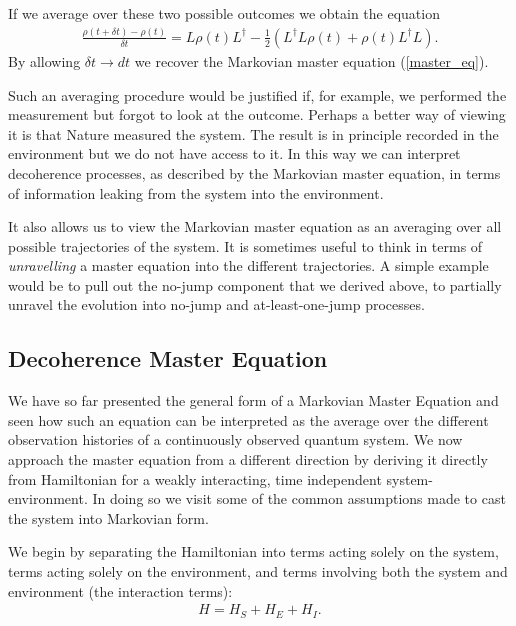 If we average over these two possible outcomes we obtain the equation
\begin{align}
\frac{\rho(t + \delta t) - \rho(t)}{\delta t} = L\rho(t)L^\dagger- \frac{1}{2} \left(L^\dagger L \rho(t) + \rho(t) L^\dagger L \right).
\end{align}
By allowing $\delta t \rightarrow dt$ we recover the Markovian master equation (\ref{master_eq}). 

Such an averaging procedure would be justified if, for example, we performed the measurement but forgot to look at the outcome. Perhaps a better way of viewing it is that Nature measured the system. The result is in principle recorded in the environment but we do not have access to it. In this way we can interpret decoherence processes, as described by the Markovian master equation, in terms of information leaking from the system into the environment.

It also allows us to view the Markovian master equation as an averaging over all possible trajectories of the system. It is sometimes useful to think in terms of \textit{unravelling} a master equation into the different trajectories. A simple example would be to pull out the no-jump component that we derived above, to partially unravel the evolution into no-jump and at-least-one-jump processes.


\subsection{Decoherence Master Equation}

We have so far presented the general form of a Markovian Master Equation and seen how such an equation can be interpreted as the average over the different observation histories of a continuously observed quantum system. We now approach the master equation from a different direction by deriving it directly from Hamiltonian for a weakly interacting, time independent system-environment. In doing so we visit some of the common assumptions made to cast the system into Markovian form.

We begin by separating the Hamiltonian into terms acting solely on the system, terms acting solely on the environment, and terms involving both the system and environment (the interaction terms):
\begin{align}
  H = H_S + H_E + H_I.
\end{align}

